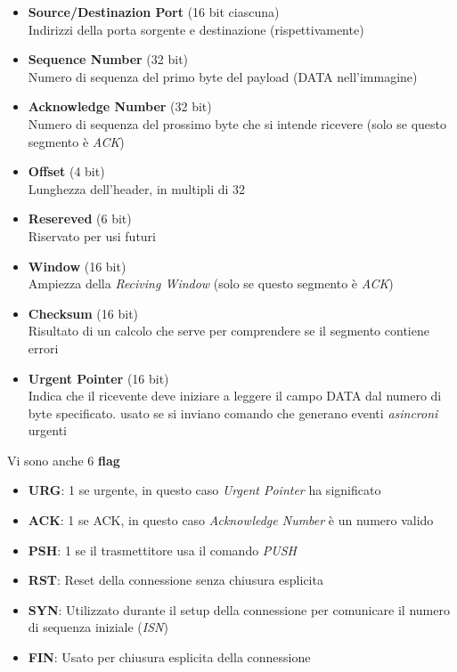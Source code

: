\documentclass{article}
\begin{document}
                \begin{itemize}
                    \item \textbf{Source/Destinazion Port} (16 bit ciascuna)\\ 
                          Indirizzi della porta sorgente e destinazione (rispettivamente)
                    \item \textbf{Sequence Number} (32 bit)\\
                          Numero di sequenza del primo byte del payload (DATA nell'immagine)
                    \item \textbf{Acknowledge Number} (32 bit)\\
                          Numero di sequenza del prossimo byte che si intende ricevere (solo se questo segmento è \textit{ACK})
                    \item \textbf{Offset} (4 bit)\\
                          Lunghezza dell'header, in multipli di 32
                    \item \textbf{Resereved} (6 bit)\\
                          Riservato per usi futuri
                    \item \textbf{Window} (16 bit)\\
                          Ampiezza della \textit{Reciving Window} (solo se questo segmento è \textit{ACK})
                    \item \textbf{Checksum} (16 bit)\\
                          Risultato di un calcolo che serve per comprendere se il segmento contiene errori
                    \item \textbf{Urgent Pointer} (16 bit)\\
                          Indica che il ricevente deve iniziare a leggere il campo DATA dal numero di byte specificato. usato se si inviano comando che generano eventi \textit{asincroni} urgenti
                \end{itemize}
                Vi sono anche 6 \textbf{flag}
                \begin{itemize}
                    \item \textbf{URG}: 1 se urgente, in questo caso \textit{Urgent Pointer} ha significato
                    \item \textbf{ACK}: 1 se ACK, in questo caso \textit{Acknowledge Number} è un numero valido
                    \item \textbf{PSH}: 1 se il trasmettitore usa il comando \textit{PUSH}
                    \item \textbf{RST}: Reset della connessione senza chiusura esplicita
                    \item \textbf{SYN}: Utilizzato durante il setup della connessione per comunicare il numero di sequenza iniziale (\textit{ISN})
                    \item \textbf{FIN}: Usato per chiusura esplicita della connessione
                \end{itemize}
                
\end{document}
